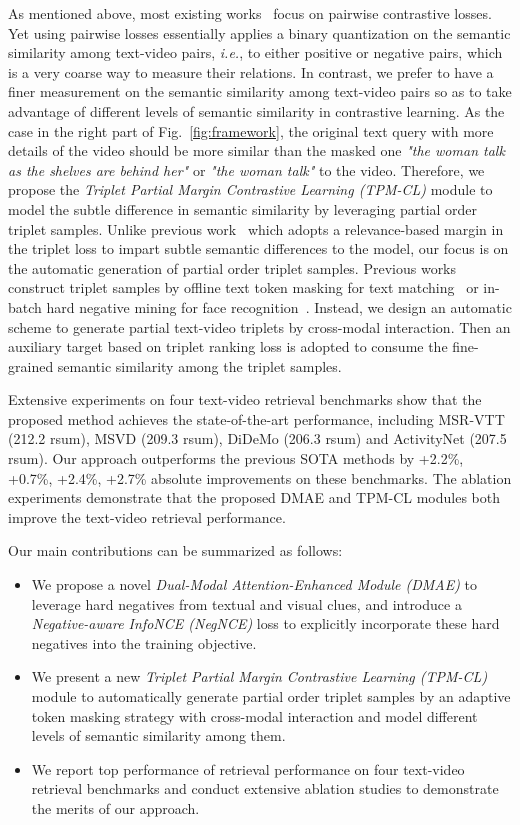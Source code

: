 \documentclass[sigconf]{acmart}
\begin{document}
As mentioned above, most existing works~\cite{clip4clip2021,ts2net2022,xclip2022,xpool2022,drl2022} focus on pairwise contrastive losses. Yet using pairwise losses essentially applies a binary quantization on the semantic similarity among text-video pairs, \emph{i.e.}, to either positive or negative pairs, which is a very coarse way to measure their relations. In contrast, we prefer to have a finer measurement on the semantic similarity among text-video pairs so as to take advantage of different levels of semantic similarity in contrastive learning. As the case in the right part of Fig.~\ref{fig:framework}, the original text query with more details of the video should be more similar than the masked one \textit{"the woman talk as the shelves are behind her"} or \textit{"the woman talk"} to the video. 
Therefore, we propose the \textit{Triplet Partial Margin Contrastive Learning (TPM-CL)} module to model the subtle difference in semantic similarity by leveraging partial order triplet samples. {Unlike previous work~\cite{falcon_relevance-based_2022} which adopts a relevance-based margin in the triplet loss to impart subtle semantic differences to the model, our focus is on the automatic generation of partial order triplet samples.}
Previous works construct triplet samples by offline text token masking for text matching~\cite{zhang2022ArcCSE} or in-batch hard negative mining for face recognition~\cite{facenet2015,triplet4reid2020}. Instead, we design an automatic scheme to generate partial text-video triplets by cross-modal interaction. 
Then an auxiliary target based on triplet ranking loss is adopted to consume the fine-grained semantic similarity among the triplet samples.

Extensive experiments on four text-video retrieval benchmarks show that the proposed method achieves the state-of-the-art performance, including MSR-VTT (212.2 rsum), MSVD (209.3 rsum), DiDeMo (206.3 rsum) and ActivityNet (207.5 rsum). Our approach outperforms the previous SOTA methods by +2.2\%, +0.7\%, +2.4\%, +2.7\% absolute improvements on these benchmarks. The ablation experiments demonstrate that the proposed DMAE and TPM-CL modules both improve the text-video retrieval performance. 

Our main contributions can be summarized as follows:
\begin{itemize}
    \item We propose a novel \textit{Dual-Modal Attention-Enhanced Module (DMAE)} to leverage hard negatives from textual and visual clues, and introduce a \textit{Negative-aware InfoNCE (NegNCE)} loss to explicitly incorporate these hard negatives into the training objective.
    \item We present a new \textit{Triplet Partial Margin Contrastive Learning (TPM-CL)} module to automatically generate partial order triplet samples by an adaptive token masking strategy with cross-modal interaction and model different levels of semantic similarity among them.
    \item We report top performance of retrieval performance on four text-video retrieval benchmarks and conduct extensive ablation studies to demonstrate the merits of our approach.
\end{itemize}
\end{document}
